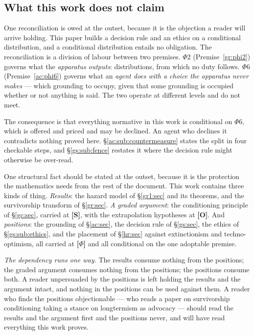 \documentclass[11pt]{article}
\numberwithin{equation}{section}
\theoremstyle{plain}
\theoremstyle{definition}
\theoremstyle{remark}
\begin{document}
\subsection{What this work does not claim}\label{intro:sub:notclaimed}

One reconciliation is owed at the outset, because it is the objection a
reader will arrive holding. This paper builds a decision rule and an
ethics on a conditional distribution, and a conditional distribution
entails no obligation. The reconciliation is a division of labour between
two premises. $\Phi2$ (Premise~\ref{gr:phi2}) governs what the
\emph{apparatus outputs}: distributions, from which no duty follows.
$\Phi6$ (Premise~\ref{ac:phi6}) governs what an \emph{agent does with a
choice the apparatus never makes} --- which grounding to occupy, given
that some grounding is occupied whether or not anything is said. The two
operate at different levels and do not meet.

The consequence is that everything normative in this work is conditional
on $\Phi6$, which is offered and priced and may be declined. An agent who
declines it contradicts nothing proved here.
\S\ref{ac:sub:countermeasure} states the split in four checkable steps,
and \S\ref{gs:sub:fence} restates it where the decision rule might
otherwise be over-read.

One structural fact should be stated at the outset, because it is the
protection the mathematics needs from the rest of the document. This work
contains three kinds of thing. \emph{Results}: the hazard model of
\S\ref{gr1:sec} and its theorems, and the survivorship transform of
\S\ref{gr:sec}. \emph{A graded argument}: the conditioning principle of
\S\ref{gc:sec}, carried at \textbf{[S]}, with the extrapolation
hypotheses at \textbf{[O]}. And \emph{positions}: the grounding of
\S\ref{ac:sec}, the decision rule of \S\ref{gs:sec}, the ethics of
\S\ref{gs:sub:ethics}, and the placement of \S\ref{hr:sec} against
extinctionism and techno-optimism, all carried at \textbf{[$\Phi$]} and
all conditional on the one adoptable premise.

\emph{The dependency runs one way.} The results consume nothing from the
positions; the graded argument consumes nothing from the positions; the
positions consume both. A reader unpersuaded by the positions is left
holding the results and the argument intact, and nothing in the positions
can be used against them. A reader who finds the positions objectionable
--- who reads a paper on survivorship conditioning taking a stance on
longtermism as advocacy --- should read the results and the argument
first and the positions never, and will have read everything this work
proves.
\end{document}
